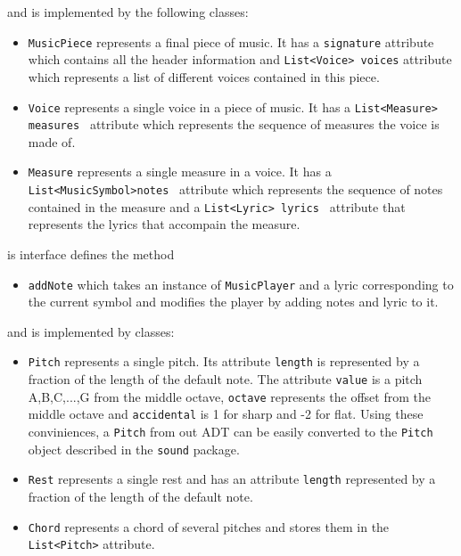 \documentclass[12pt]{book}
\begin{document}
\noindent and is implemented by the following classes:
\begin{itemize} 
\item { \tt MusicPiece} represents a final piece of music.   It has a {\tt signature} attribute which contains all the header information and {\tt List<Voice> voices} attribute which represents a list of different voices contained in this piece.
\item {\tt Voice}  represents a single voice in a piece of music. It has a {\tt List<Measure> measures } attribute which represents the sequence of measures the voice is made of.
\item {\tt Measure}  represents a single measure in a voice. It has a {\tt List<MusicSymbol>notes } attribute which represents the sequence of notes contained in the measure and a  {\tt List<Lyric> lyrics } attribute that represents the lyrics that accompain the measure.
\end{itemize}
\noindent\makebox[\linewidth]{\rule{\textwidth}{0.4pt}}

\smallskip
{} is  interface defines the  method
\begin{itemize} 
\item { \tt addNote} which takes an instance of  {\tt MusicPlayer} and a lyric corresponding to the current symbol and modifies the player by adding notes and lyric to it. 
\end{itemize}
\noindent and is implemented by classes:
\begin{itemize} 
\item { \tt Pitch} represents a single pitch. Its attribute {\tt length} is represented by a fraction  of the length of the default note. The attribute {\tt value} is a pitch A,B,C,...,G from the middle octave,  {\tt octave} represents the offset from the middle octave and  {\tt accidental} is 1 for sharp and -2 for flat. Using these conviniences,  a {\tt Pitch} from out ADT can be easily converted to the {\tt Pitch} object described in the {\tt sound} package.
\item { \tt Rest} represents a single rest and has an attribute {\tt length}  represented by a fraction of the length of the default note. 
\item {\tt Chord} represents a chord of several pitches and stores them in the {\tt List<Pitch>} attribute.
\end{itemize}

\noindent\makebox[\linewidth]{\rule{\textwidth}{0.4pt}}
\end{document}
